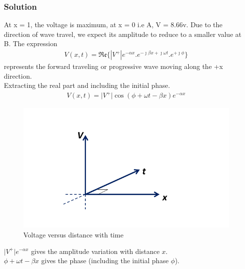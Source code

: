 \begin{exmp}
\subsubsection*{Solution}
At x = 1, the voltage is maximum, at x = 0 i.e A, V = 8.66v. Due to the direction of wave travel, we expect its amplitude to reduce to a smaller value at B. The expression
\begin{align}
V(x,t) = \mathfrak{Re}\{\left| V^+\right|  e^{-\alpha x}.e^{-\jmath\beta x + \jmath\omega t}.e^{+\jmath\phi}\} 
\label{eqn:voltagelec3soln}
\end{align}
represents the forward traveling or progressive wave moving along the +x direction.\\
Extracting the real part and including the initial phase.
\begin{align*}
V(x,t) = \lvert V^+\rvert\cos(\phi + \omega t - \beta x)e^{-\alpha x}
\end{align*}
\begin{figure}[h]
\centering
\includegraphics[width=1\linewidth]{./graphics/fig3.3}
\caption{Voltage versus distance with time}
\end{figure}

$\lvert V^+\rvert e^{-\alpha x} $ gives the amplitude variation with distance $ x $. \\
$ \phi + \omega t - \beta x $ gives the phase (including the initial phase $ \phi $).


\end{exmp}
